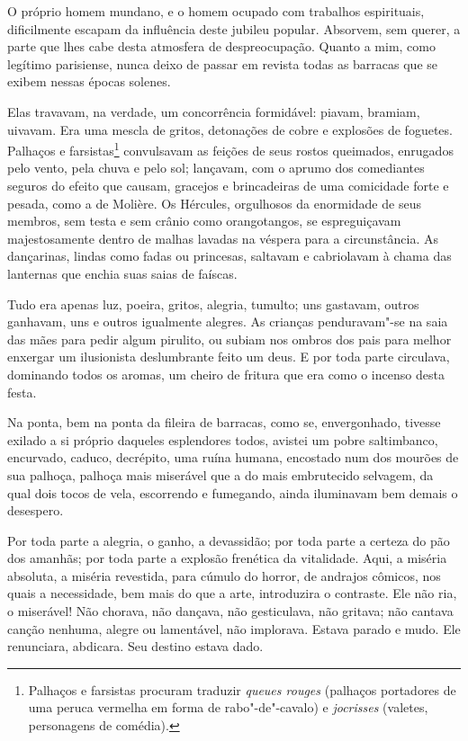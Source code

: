 O próprio homem mundano, e o homem ocupado com trabalhos espirituais, dificilmente escapam da influência deste jubileu popular. 
Absorvem, sem querer, a parte que lhes cabe desta atmosfera de
despreocupação. Quanto a mim, como legítimo parisiense, nunca deixo
de passar em revista todas as barracas que se exibem nessas épocas
solenes.

Elas travavam, na verdade, um concorrência formidável: piavam, bramiam,
uivavam. Era uma mescla de gritos, detonações de cobre e explosões de
foguetes. Palhaços e farsistas\protect\footnote{ Palhaços e farsistas procuram 
traduzir \textit{queues rouges} (palhaços
portadores de uma peruca vermelha em forma de rabo"-de"-cavalo) e
\textit{jocrisses} (valetes, personagens de comédia).} convulsavam as feições
de seus rostos queimados, enrugados pelo vento, pela chuva e pelo sol;
lançavam, com o aprumo dos comediantes seguros do efeito que causam,
gracejos e brincadeiras de uma comicidade forte e pesada, como a de
Molière. Os Hércules, orgulhosos da enormidade de seus membros, sem
testa e sem crânio como orangotangos, se espreguiçavam
majestosamente dentro de malhas lavadas na véspera para a circunstância. As
dançarinas, lindas como fadas ou princesas, saltavam e cabriolavam à
chama das lanternas que enchia suas saias de faíscas.

Tudo era apenas luz, poeira, gritos, alegria, tumulto; uns gastavam,
outros ganhavam, uns e outros igualmente alegres. As crianças
penduravam"-se na saia das mães para pedir algum pirulito, ou
subiam nos ombros dos pais para melhor enxergar um ilusionista
deslumbrante feito um deus. E por toda parte circulava, dominando todos
os aromas, um cheiro de fritura que era como o incenso desta festa.

Na ponta, bem na ponta da fileira de barracas, como se,
envergonhado, tivesse exilado a si próprio daqueles esplendores todos,
avistei um pobre saltimbanco, encurvado, caduco, decrépito, uma
ruína humana, encostado num dos mourões de sua palhoça, palhoça
mais miserável que a do mais embrutecido selvagem, da qual dois tocos
de vela, escorrendo e fumegando, ainda iluminavam bem demais o
desespero.

Por toda parte a alegria, o ganho, a devassidão; por toda parte a
certeza do pão dos amanhãs; por toda parte a explosão frenética da
vitalidade. Aqui, a miséria absoluta, a miséria revestida, para cúmulo
do horror, de andrajos cômicos, nos quais a necessidade, bem mais do
que a arte, introduzira o contraste. Ele não ria, o miserável! Não
chorava, não dançava, não gesticulava, não gritava; não cantava canção nenhuma, alegre ou lamentável, não implorava. Estava parado e
mudo. Ele renunciara, abdicara. Seu destino estava
dado.

